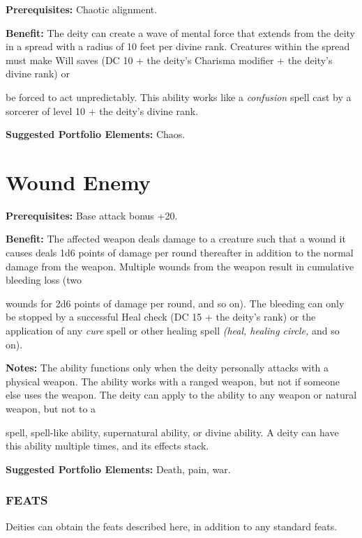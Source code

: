 \documentclass{article}
\begin{document}
\textbf{Prerequisites:} Chaotic alignment.

\textbf{Benefit:} The deity can create a wave of mental force that extends from 
the deity in a spread with a radius of 10 feet per divine rank. Creatures within 
the spread must make Will saves (DC 10 + the deity's Charisma modifier + the deity's 
divine rank) or

be forced to act unpredictably. This ability works like a \textit{confusion }spell 
cast by a sorcerer of level 10 + the deity's divine rank.

\textbf{Suggested Portfolio Elements:} Chaos.

\vspace{12pt}
\section*{Wound Enemy}

\textbf{Prerequisites:} Base attack bonus +20.

\textbf{Benefit:} The affected weapon deals damage to a creature such that a wound 
it causes deals 1d6 points of damage per round thereafter in addition to the normal 
damage from the weapon. Multiple wounds from the weapon result in cumulative bleeding 
loss (two

wounds for 2d6 points of damage per round, and so on). The bleeding can only be 
stopped by a successful Heal check (DC 15 + the deity's rank) or the application 
of any \textit{cure }spell or other healing spell \textit{(heal, healing circle, 
}and so on).

\textbf{Notes:} The ability functions only when the deity personally attacks with 
a physical weapon. The ability works with a ranged weapon, but not if someone else 
uses the weapon. The deity can apply to the ability to any weapon or natural weapon, 
but not to a

spell, spell-like ability, supernatural ability, or divine ability. A deity can 
have this ability multiple times, and its effects stack. 

\textbf{Suggested Portfolio Elements:} Death, pain, war.

\vspace{24pt}
\subsubsection*{{\LARGE{}FEATS}}

Deities can obtain the feats described here, in addition to any standard feats.
\end{document}
